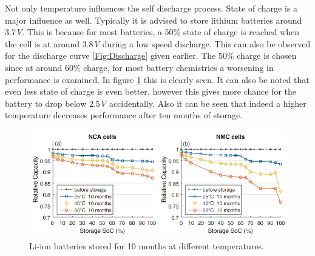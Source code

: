Not only temperature influences the self discharge process. State of charge is a major influence as well. Typically it is advised to store lithium batteries around 3.7\textit{V}. This is because for most batteries, a 50\% state of charge is reached when the cell is at around 3.8\textit{V} during a low speed discharge. This can also be observed for the discharge curve \ref{Fig:Discharge} given earlier. The 50\% charge is chosen since at around 60\% charge, for most battery chemistries a worsening in performance is examined. In figure \ref{Fig:SOC} this is clearly seen. It can also be noted that even less state of charge is even better, however this gives more chance for the battery to drop below 2.5\textit{V} accidentally. Also it can be seen that indeed a higher temperature decreases performance after ten months of storage.

\begin{figure} [H]
	\centering
	\includegraphics[width=0.8\linewidth]{Figures/SOC.PNG}
	\caption{Li-ion batteries stored for 10 months at different temperatures\cite{Keil2016}.}
   \label{Fig:SOC}
\end{figure}


\newpage